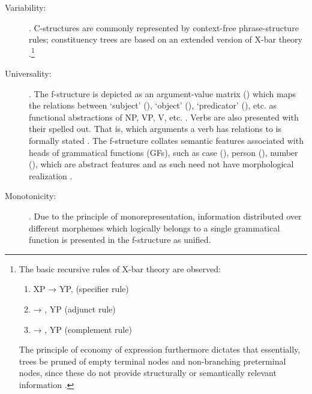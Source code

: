 \begin{description}
\item[Variability:] . 
C-structures are commonly represented by context-free phrase-structure rules; 
constituency trees are based on an extended version of X-bar theory 
\citep[42]{bresnan2016}.\footnote{The basic recursive rules of X-bar theory 
are observed:
\begin{enumerate}[nosep, leftmargin={2\footnotemargin}]
\item XP → YP,  (specifier rule)
\item {} → , YP (adjunct rule)
\item {} → , YP (complement rule)
\end{enumerate}

The principle of economy of expression furthermore dictates that essentially, 
trees be pruned of empty terminal nodes and non-branching preterminal nodes, 
since these do not provide structurally or semantically relevant information 
\citep[119--128]{bresnan2016}.}

\item[Universality:] . The f-structure is depicted 
as an argument-value matrix (\Avm{}) which maps the relations between 
`subject' (\Sbj{}), `object' (\Obj{}), `predicator' (\Pred{}), etc. as 
functional abstractions of NP, VP, V, etc. \citep[42]{bresnan2016}. Verbs 
are also presented with their  spelled out. That is, which 
arguments a verb has relations to is formally stated \citep[15]{bresnan2016}. 
The f-structure collates semantic features associated with heads of grammatical 
functions (GFs), such as case (\Case{}), person (\Pers{}), number (\Num{}), 
which are abstract features and as such need not have morphological realization 
\citep[43]{bresnan2016}.

\item[Monotonicity:] . Due to the principle of monorepresentation, 
information distributed over different morphemes which logically 
belongs to a single grammatical function is presented in the f-structure as 
unified.

\end{description}

